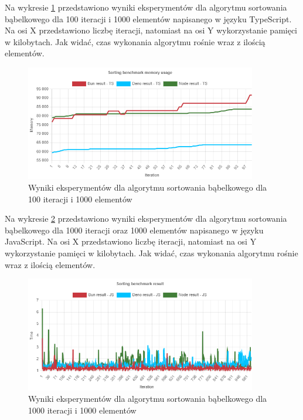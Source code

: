 Na wykresie \ref{fig:bubble_sorting_e2_memory_ts} przedstawiono wyniki eksperymentów dla algorytmu sortowania bąbelkowego dla 100 iteracji i 1000 elementów napisanego w języku TypeScript. Na osi X przedstawiono liczbę iteracji, natomiast na osi Y wykorzystanie pamięci w kilobytach. Jak widać, czas wykonania algorytmu rośnie wraz z ilością elementów.
\begin{figure}[H]
  \centering
  \includegraphics[width=0.9\textwidth]{Figures/sorting/bubble/e2_memory_ts.png}
  \caption{Wyniki eksperymentów dla algorytmu sortowania bąbelkowego dla 100 iteracji i 1000 elementów}
  \label{fig:bubble_sorting_e2_memory_ts}
\end{figure}

Na wykresie \ref{fig:bubble_sorting_e3} przedstawiono wyniki eksperymentów dla algorytmu sortowania bąbelkowego dla 1000 iteracji oraz 1000 elementów napisanego w języku JavaScript. Na osi X przedstawiono liczbę iteracji, natomiast na osi Y wykorzystanie pamięci w kilobytach. Jak widać, czas wykonania algorytmu rośnie wraz z ilością elementów.
\begin{figure}[H]
  \centering
  \includegraphics[width=0.9\textwidth]{Figures/sorting/bubble/e3_js.png}
  \caption{Wyniki eksperymentów dla algorytmu sortowania bąbelkowego dla 1000 iteracji i 1000 elementów}
  \label{fig:bubble_sorting_e3}
\end{figure}

